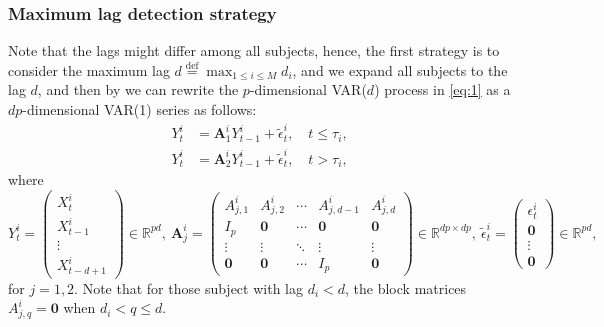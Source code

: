 \documentclass[11pt]{article}
\begin{document}
\subsubsection{Maximum lag detection strategy}\label{sec:max-lag}
Note that the lags might differ among all subjects, hence, the first strategy is
to consider the maximum lag $d \overset{\text{def}}{=} \max_{1\leq i \leq M}d_i$, and we expand all subjects to the lag $d$, and then by \cite{lutkepohl2005new} we can rewrite the $p$-dimensional VAR($d$) process in \eqref{eq:1} as a  $dp$-dimensional VAR(1) series as follows:
\begin{equation*}
    \begin{aligned}
        Y_t^i &= \mathbf{A}_1^iY_{t-1}^i + \widetilde{\epsilon}_t^i, \quad t \leq \tau_i, \\
        Y_t^i &= \mathbf{A}^i_2Y_{t-1}^i + \widetilde{\epsilon}_t^i, \quad t > \tau_i,
    \end{aligned}
\end{equation*}
where
\begin{equation*}
    Y^i_t = 
    \begin{pmatrix}
        X_t^i \\
        X_{t-1}^i \\
        \vdots \\
        X_{t-d+1}^i
    \end{pmatrix} \in \mathbb{R}^{pd},\ 
    \mathbf{A}_j^i = 
    \begin{pmatrix}
        A_{j,1}^i & A_{j,2}^i & \cdots & A_{j,d-1}^i & A_{j,d}^i \\
        I_p & \mathbf{0} & \cdots & \mathbf{0} & \mathbf{0} \\
        \vdots & \vdots & \ddots & \vdots & \vdots \\
        \mathbf{0} & \mathbf{0} & \cdots & I_p & \mathbf{0}
    \end{pmatrix} \in \mathbb{R}^{dp\times dp},\ 
    \widetilde{\epsilon}_t^i = 
    \begin{pmatrix}
        \epsilon_t^i \\
        \mathbf{0} \\
        \vdots \\
        \mathbf{0}
    \end{pmatrix} \in \mathbb{R}^{pd},
\end{equation*}
for $j=1,2$. Note that for those subject with lag $d_i < d$, the block matrices $A_{j,q}^i = \mathbf{0}$ when $d_i < q \leq d$.  
\end{document}
